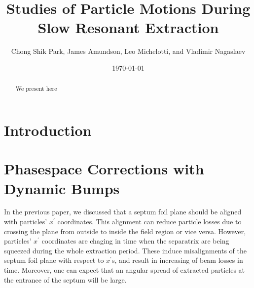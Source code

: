 \documentclass[aps,prstab,onecolumn,preprint,nofootinbib]{revtex4-1}
\begin{document}
\title{Studies of Particle Motions During Slow Resonant Extraction}
\author{Chong Shik Park, James Amundson, Leo Michelotti, and Vladimir Nagaslaev}
\date{\today}

\begin{abstract}
We present here 
\end{abstract}

\pacs{}
\maketitle

\setcounter{tocdepth}{5}


\section{\label{sec:intro}Introduction}

\clearpage
\section{\label{sec:bump}Phasespace Corrections with Dynamic Bumps}

In the previous paper, we discussed that a septum foil plane should be aligned with particles' $x^{\prime}$ coordinates. This alignment can reduce particle losses due to crossing the plane from outside to inside the field region or vice versa. However, particles' $x^{\prime}$ coordinates are chaging in time when the separatrix are being squeezed during the whole extraction period. These induce misalignments of the septum foil plane with respect to $x^{\prime}$s, and result in increasing of beam losses in time. Moreover, one can expect that an angular spread of extracted particles at the entrance of the septum will be large. 
\end{document}
